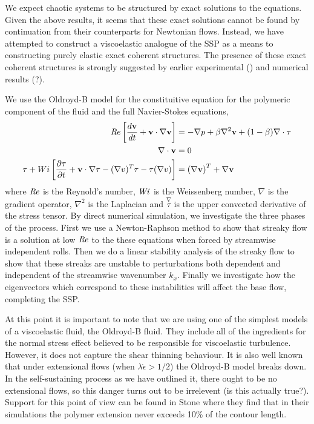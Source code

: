 \documentclass{jfm}
\newcommand\Wi{\mbox{\textit{Wi}}}
\newcommand{\dt}[1]{\frac{d #1}{d t}} %
\newcommand\Rey{\mbox{\textit{Re}}}  %
\begin{document}
We expect chaotic systems to be structured by exact solutions to the equations.
Given the above results, it seems that these exact solutions cannot be found by
continuation from their counterparts for Newtonian flows. Instead, we have
attempted to construct a viscoelastic analogue of the SSP as a means to
constructing purely elastic exact coherent structures.  The presence of these
exact coherent structures is strongly suggested by earlier experimental
(\cite{Pan2013, Samanta2013}) and numerical results (\cite{Morozov2007}?).

We use the Oldroyd-B model for the constituitive equation for the polymeric
component of the fluid and the full Navier-Stokes equations,
\begin{align}
    \Rey \left[ \dt{\mathbf{v}} + \mathbf{v} \cdot \nabla  \mathbf{v} \right] &= - \nabla p + \beta \nabla^{2} \mathbf{v} + (1-\beta)\nabla \cdot \mathbf{\tau} \label{eq:Navier-Stokes}\\
    \nabla \cdot \mathbf{v} &= 0 \label{eq:incompressibility}\\
    \tau + Wi\left[\frac{\partial \tau}{\partial t} + \mathbf{v} \cdot \nabla \tau - (\nabla v)^T \tau - \tau (\nabla v) \right] &= \left(\nabla \mathbf{v}\right)^{T} + \nabla{\mathbf{v}}\label{eq:Oldroyd-B} \\
\end{align}
where $\Rey$ is the Reynold's number, $\Wi$ is the Weissenberg number, $\nabla$
is the gradient operator, $\nabla^{2}$ is the Laplacian and $
\overset{\nabla}\tau$ is the upper convected derivative of the stress tensor.
By direct numerical simulation, we investigate the three phases of the process.
First we use a Newton-Raphson method to show that streaky flow is a solution at
low $\Rey$ to the these equations when forced by streamwise independent rolls.
Then we do a linear stability analysis of the streaky flow to show that these
streaks are unstable to perturbations both dependent and independent of the
streamwise wavenumber $k_x$. Finally we investigate how the eigenvectors which
correspond to these instabilities will affect the base flow, completing the
SSP.

At this point it is important to note that we are using one of the simplest
models of a viscoelastic fluid, the Oldroyd-B fluid. They include all of the
ingredients for the normal stress effect believed to be responsible for
viscoelastic turbulence.  However, it does not capture the shear thinning
behaviour. It is also well known that under extensional flows (when $\lambda
\dot{\epsilon} > 1/2$) the Oldroyd-B model breaks down. In the self-sustaining
process as we have outlined it, there ought to be no extensional flows, so this
danger turns out to be irrelevent (is this actually true?). Support for this
point of view can be found in Stone \cite{Stone2004} where they find that in
their simulations the polymer extension never exceeds 10\% of the contour
length. 
\end{document}
